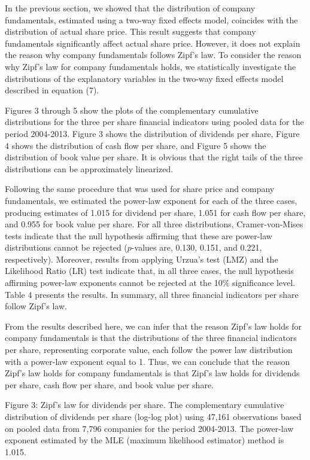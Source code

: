 \documentclass[10pt,a4paper]{article}
\begin{document}
In the previous section, we showed that the distribution of company fundamentals, estimated using a two-way fixed effects model, coincides with the distribution of actual share price. This result suggests that company fundamentals significantly affect actual share price. However, it does not explain the reason why company fundamentals follows Zipf's law. To consider the reason why Zipf's law for company fundamentals holds, we statistically investigate the distributions of the explanatory variables in the two-way fixed effects model described in equation (7).
 
Figures 3 through 5 show the plots of the complementary cumulative distributions for the three per share financial indicators using pooled data for the period 2004-2013. Figure 3 shows the distribution of dividends per share, Figure 4 shows the distribution of cash flow per share, and Figure 5 shows the distribution of book value per share. It is obvious that the right tails of the three distributions can be approximately linearized. 

Following the same procedure that was used for share price and company fundamentals, we estimated the power-law exponent for each of the three cases, producing estimates of 1.015 for dividend per share, 1.051 for cash flow per share, and 0.955 for book value per share. For all three distributions, Cramer-von-Mises tests indicate that the null hypothesis affirming that these are power-law distributions cannot be rejected ($p$-values are, 0.130, 0.151, and 0.221, respectively). Moreover, results from applying Urzua's test (LMZ) and the Likelihood Ratio (LR) test indicate that, in all three cases, the null hypothesis affirming power-law exponents cannot be rejected at the 10\% significance level. Table 4 presents the results. In summary, all three financial indicators per share follow Zipf's law.
 
From the results described here, we can infer that the reason Zipf's law holds for company fundamentals is that the distributions of the three financial indicators per share, representing corporate value, each follow the power law distribution with a power-law exponent equal to 1. Thus, we can conclude that the reason Zipf's law holds for company fundamentals is that Zipf's law holds for dividends per share, cash flow per share, and book value per share. 

Figure 3: Zipf's law for dividends per share. The complementary cumulative distribution of dividends per share (log-log plot) using 47,161 observations based on pooled data from 7,796 companies for the period 2004-2013. The power-law exponent estimated by the MLE (maximum likelihood estimator) method is 1.015.
 
\end{document}
